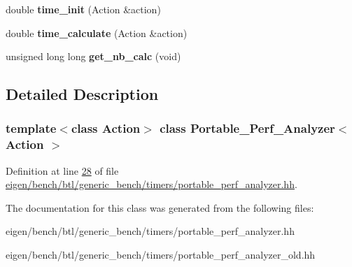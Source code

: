 \begin{DoxyCompactItemize}
\item 
\mbox{\label{class_portable___perf___analyzer_a71b2de0ccfa0ab1ef2e59821331821af}} 
double {\bfseries time\+\_\+init} (Action \&action)
\item 
\mbox{\label{class_portable___perf___analyzer_aebc0eee477594997c8e823e9066d558e}} 
double {\bfseries time\+\_\+calculate} (Action \&action)
\item 
\mbox{\label{class_portable___perf___analyzer_a075acb640706576bf727b8d3ac48c325}} 
unsigned long long {\bfseries get\+\_\+nb\+\_\+calc} (void)
\end{DoxyCompactItemize}


\subsection{Detailed Description}
\subsubsection*{template$<$class Action$>$\newline
class Portable\+\_\+\+Perf\+\_\+\+Analyzer$<$ Action $>$}



Definition at line \hyperlink{eigen_2bench_2btl_2generic__bench_2timers_2portable__perf__analyzer_8hh_source_l00028}{28} of file \hyperlink{eigen_2bench_2btl_2generic__bench_2timers_2portable__perf__analyzer_8hh_source}{eigen/bench/btl/generic\+\_\+bench/timers/portable\+\_\+perf\+\_\+analyzer.\+hh}.



The documentation for this class was generated from the following files\+:\begin{DoxyCompactItemize}
\item 
eigen/bench/btl/generic\+\_\+bench/timers/portable\+\_\+perf\+\_\+analyzer.\+hh\item 
eigen/bench/btl/generic\+\_\+bench/timers/portable\+\_\+perf\+\_\+analyzer\+\_\+old.\+hh\end{DoxyCompactItemize}
